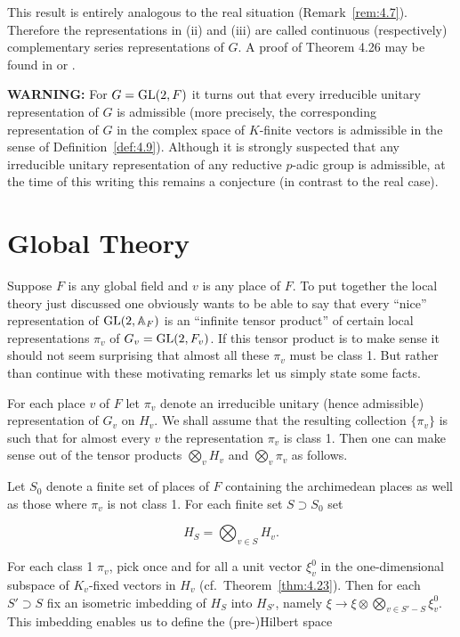 This result is entirely analogous to the real situation (Remark~\ref{rem:4.7}). Therefore the representations in (ii) and (iii) are called continuous (respectively) complementary series representations of $G$. A proof of Theorem 4.26 may be found in \cite{JacquetLanglands} or \cite{Godement}.

\textbf{WARNING:} For $G = \operatorname{GL}(2,F)$ it turns out that every irreducible unitary representation of $G$ is admissible (more precisely, the corresponding representation of $G$ in the complex space of $K$-finite vectors is admissible in the sense of Definition~\ref{def:4.9}). Although it is strongly suspected that any irreducible unitary representation of any reductive $p$-adic group is admissible, at the time of this writing this remains a conjecture (in contrast to the real case).

\section{Global Theory}\label{sec:4c}

Suppose $F$ is any global field and $v$ is any place of $F$. To put together the local theory just discussed one obviously wants to be able to say that every ``nice'' representation of $\operatorname{GL}(2,\mathbb{A}_F)$ is an ``infinite tensor product'' of certain local representations $\pi_v$ of $G_v = \operatorname{GL}(2, F_v)$. If this tensor product is to make sense it should not seem surprising that almost all these $\pi_v$ must be class 1. But rather than continue with these motivating remarks let us simply state some facts.

For each place $v$ of $F$ let $\pi_v$ denote an irreducible unitary (hence admissible) representation of $G_v$ on $H_v$. We shall assume that the resulting collection $\{\pi_v\}$ is such that for almost every $v$ the representation $\pi_v$ is class 1. Then one can make sense out of the tensor products $\bigotimes_{v} H_v$ and $\bigotimes_{v} \pi_v$ as follows.

Let $S_0$ denote a finite set of places of $F$ containing the archimedean places as well as those where $\pi_v$ is not class 1. For each finite set $S \supset S_0$ set

\[
H_S = \bigotimes_{v \in S} H_v.
\]

For each class 1 $\pi_v$, pick once and for all a unit vector $\xi_v^0$ in the one-dimensional subspace of $K_v$-fixed vectors in $H_v$ (cf.\ Theorem~\ref{thm:4.23}). Then for each $S' \supset S$ fix an isometric imbedding of $H_S$ into $H_{S'}$, namely $\xi \to \xi \otimes \bigotimes_{v \in S' - S}\xi_v^0$. This imbedding enables us to define the (pre-)Hilbert space

